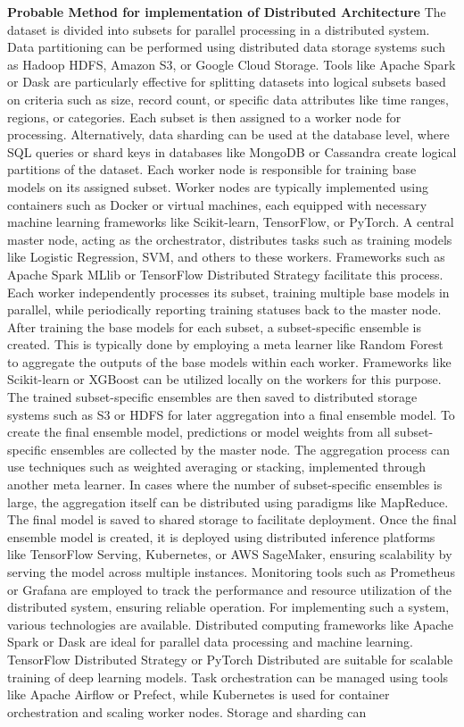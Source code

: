\noindent
\textbf{Probable Method for implementation of Distributed Architecture}
\newline
\noindent
The dataset is divided into subsets for parallel processing in a distributed system. Data partitioning can be performed using distributed data storage systems such as Hadoop HDFS, Amazon S3, or Google Cloud Storage. Tools like Apache Spark or Dask are particularly effective for splitting datasets into logical subsets based on criteria such as size, record count, or specific data attributes like time ranges, regions, or categories. Each subset is then assigned to a worker node for processing. Alternatively, data sharding can be used at the database level, where SQL queries or shard keys in databases like MongoDB or Cassandra create logical partitions of the dataset. Each worker node is responsible for training base models on its assigned subset. Worker nodes are typically implemented using containers such as Docker or virtual machines, each equipped with necessary machine learning frameworks like Scikit-learn, TensorFlow, or PyTorch. A central master node, acting as the orchestrator, distributes tasks such as training models like Logistic Regression, SVM, and others to these workers. Frameworks such as Apache Spark MLlib or TensorFlow Distributed Strategy facilitate this process. Each worker independently processes its subset, training multiple base models in parallel, while periodically reporting training statuses back to the master node. After training the base models for each subset, a subset-specific ensemble is created. This is typically done by employing a meta learner like Random Forest to aggregate the outputs of the base models within each worker. Frameworks like Scikit-learn or XGBoost can be utilized locally on the workers for this purpose. The trained subset-specific ensembles are then saved to distributed storage systems such as S3 or HDFS for later aggregation into a final ensemble model. To create the final ensemble model, predictions or model weights from all subset-specific ensembles are collected by the master node. The aggregation process can use techniques such as weighted averaging or stacking, implemented through another meta learner. In cases where the number of subset-specific ensembles is large, the aggregation itself can be distributed using paradigms like MapReduce. The final model is saved to shared storage to facilitate deployment. Once the final ensemble model is created, it is deployed using distributed inference platforms like TensorFlow Serving, Kubernetes, or AWS SageMaker, ensuring scalability by serving the model across multiple instances. Monitoring tools such as Prometheus or Grafana are employed to track the performance and resource utilization of the distributed system, ensuring reliable operation. For implementing such a system, various technologies are available. Distributed computing frameworks like Apache Spark or Dask are ideal for parallel data processing and machine learning. TensorFlow Distributed Strategy or PyTorch Distributed are suitable for scalable training of deep learning models. Task orchestration can be managed using tools like Apache Airflow or Prefect, while Kubernetes is used for container orchestration and scaling worker nodes. Storage and sharding can 